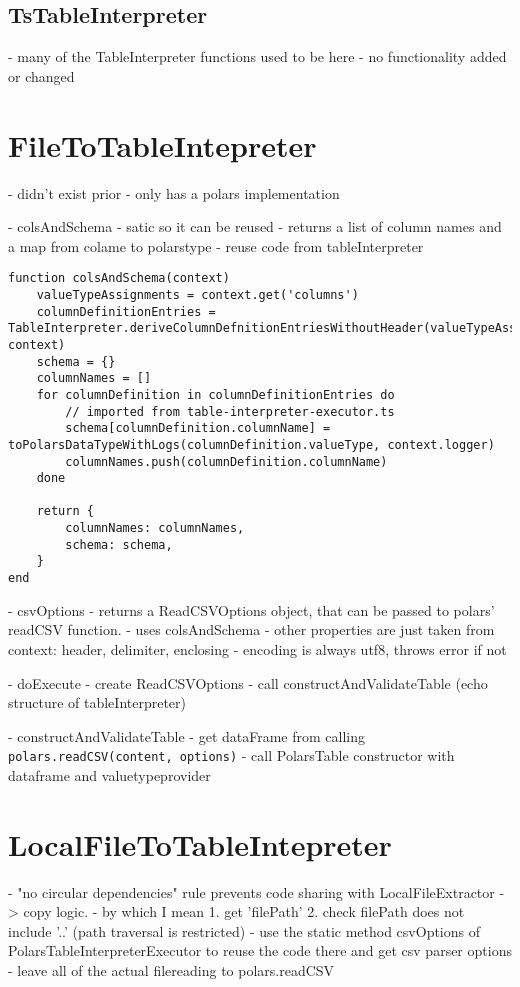 \subsection{TsTableInterpreter}
- many of the TableInterpreter functions used to be here
- no functionality added or changed

\section{FileToTableIntepreter}
- didn't exist prior
- only has a polars implementation

- colsAndSchema
- satic so it can be reused
- returns a list of column names and a map from colame to polarstype
- reuse code from tableInterpreter
\begin{listing}
	\begin{verbatim}
function colsAndSchema(context)
	valueTypeAssignments = context.get('columns')
	columnDefinitionEntries = TableInterpreter.deriveColumnDefnitionEntriesWithoutHeader(valueTypeAssignments, context)
	schema = {}
	columnNames = []
	for columnDefinition in columnDefinitionEntries do
		// imported from table-interpreter-executor.ts
		schema[columnDefinition.columnName] = toPolarsDataTypeWithLogs(columnDefinition.valueType, context.logger)
		columnNames.push(columnDefinition.columnName)
	done

	return {
		columnNames: columnNames,
		schema: schema,
	}
end
	\end{verbatim}
\end{listing}

- csvOptions
- returns a ReadCSVOptions object, that can be passed to polars' readCSV function.
- uses colsAndSchema
- other properties are just taken from context: header, delimiter, enclosing
- encoding is always utf8, throws error if not

- doExecute
- create ReadCSVOptions
- call constructAndValidateTable (echo structure of tableInterpreter)

- constructAndValidateTable
- get dataFrame from calling \Verb|polars.readCSV(content, options)|
- call PolarsTable constructor with dataframe and valuetypeprovider

\section{LocalFileToTableIntepreter}
- "no circular dependencies" rule prevents code sharing with LocalFileExtractor -> copy logic.
- by which I mean 1. get 'filePath' 2. check filePath does not include '..' (path traversal is restricted)
- use the static method csvOptions of PolarsTableInterpreterExecutor to reuse the code there and get csv parser options
- leave all of the actual filereading to polars.readCSV


